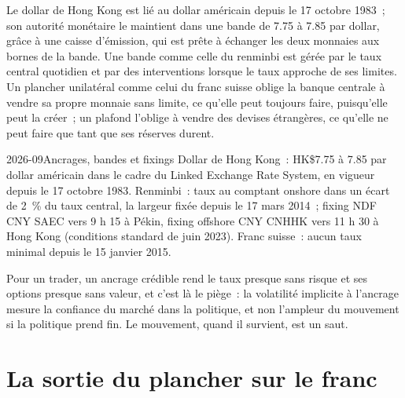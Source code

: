 Le dollar de Hong Kong est lié au dollar américain depuis le 17 octobre 1983~; son
autorité monétaire le maintient dans une bande de 7.75 à 7.85 par dollar, grâce à
une caisse d'émission, qui est prête à échanger les deux monnaies aux bornes de la
bande. Une bande comme celle du renminbi est gérée par le taux central quotidien
et par des interventions lorsque le taux approche de ses limites. Un
plancher unilatéral comme celui du franc suisse oblige la banque centrale à vendre sa propre
monnaie sans limite, ce qu'elle peut toujours faire, puisqu'elle peut la créer~; un plafond
l'oblige à vendre des devises étrangères, ce qu'elle ne peut faire que tant que ses
réserves durent.

\begin{dated}{2026-09}{Ancrages, bandes et fixings}\label{dat:m2:emerging-market-fx-and-ndfs:regimes}
Dollar de Hong Kong~: HK\$7.75 à 7.85 par dollar américain dans le cadre du Linked Exchange Rate
System, en vigueur depuis le 17 octobre 1983. Renminbi~: taux au comptant onshore dans un écart de 2~\% du
taux central, la largeur fixée depuis le 17 mars 2014~; fixing NDF CNY SAEC vers
9 h 15 à Pékin, fixing offshore CNY CNHHK vers 11 h 30 à Hong Kong
(conditions standard de juin 2023). Franc suisse~: aucun taux minimal depuis le 15 janvier
2015.
\end{dated}

Pour un trader, un ancrage crédible rend le taux presque sans risque et ses options
presque sans valeur, et c'est là le piège~: la volatilité implicite à l'ancrage mesure
la confiance du marché dans la politique, et non l'ampleur du mouvement si la politique
prend fin. Le mouvement, quand il survient, est un saut.

\section{La sortie du plancher sur le franc}

